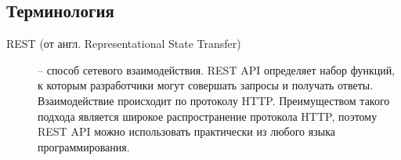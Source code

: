 \subsection{Терминология}
\begin{description}

  \item[REST (от англ. Representational State Transfer)] -- способ сетевого
    взаимодействия.  REST API определяет набор функций, к которым разработчики
    могут совершать запросы и получать ответы. Взаимодействие происходит по
    протоколу HTTP.  Преимуществом такого подхода является широкое
    распространение протокола HTTP, поэтому REST API можно использовать
    практически из любого языка программирования.
    
\end{description}

